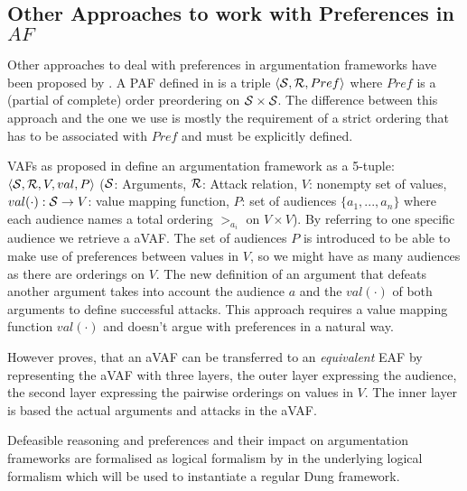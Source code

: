 \subsection{Other Approaches to work with Preferences in $AF$}
\label{app:other_afs}
\label{sub:paf}
Other approaches to deal with preferences in argumentation frameworks have been proposed by \cite{amgoud,amgoud1998,Bench2003,pollock1987, prakken1997}. A \gls{PAF} defined in \cite{amgoud1998} is  a triple $\langle \S, \R, Pref \rangle$ where $Pref$ is a (partial of complete) order preordering on $\S \times \S$. The difference between this approach and the one we use is mostly the requirement of a strict ordering that has to be associated with $Pref$ and must be explicitly defined.
\label{sub:vaf}

\Glspl{VAF} as proposed in \cite{Bench2003} define an argumentation framework as a 5-tuple: $\langle \S, \R, V, val, P \rangle$ ($\S$: Arguments, $\R$: Attack relation, $V$: nonempty set of values, $val(\cdot): \S \rightarrow V$: value mapping function, $P$: set of audiences $\{a_1, ..., a_n\}$ where each audience names a total ordering $>_{a_i}$ on $V \times V$). By referring to one specific audience we retrieve a \gls{aVAF}. The set of audiences $P$ is introduced to be able to make use of preferences between values in $V$, so we might have as many audiences as there are orderings on $V$. The new definition of an argument that defeats another argument takes into account the audience $a$ and the $val(\cdot)$ of both arguments to define successful attacks. This approach requires a value mapping function $val(\cdot)$ and doesn't argue with preferences in a natural way. 

However \cite{Modgil2009} proves, that an \gls{aVAF} can be transferred to an \textit{equivalent} \gls{EAF} by representing the \gls{aVAF} with three layers, the outer layer expressing the audience, the second layer expressing the pairwise orderings on values in $V$. The inner layer is based the actual arguments and attacks in the \gls{aVAF}.

Defeasible reasoning and preferences and their impact on argumentation frameworks are formalised as logical formalism by \cite{pollock1987, prakken1997} in the underlying logical formalism which will be used to instantiate a regular Dung framework.